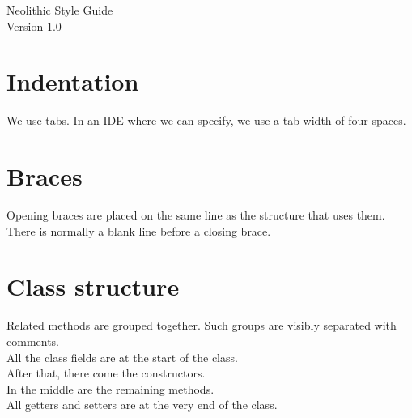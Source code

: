 \documentclass[10pt,a4paper]{report}
\author{Michael Plüss}
\begin{document}
\Huge{Neolithic Style Guide}\\
\normalsize{Version 1.0}\\

\section{Indentation}

We use tabs. In an IDE where we can specify, we use a tab width of four spaces.\\

\section{Braces}

Opening braces are placed on the same line as the structure that uses them.\\
There is normally a blank line before a closing brace.\\

\section{Class structure}

Related methods are grouped together. Such groups are visibly separated with comments.\\
All the class fields are at the start of the class.\\
After that, there come the constructors.\\
In the middle are the remaining methods.\\
All getters and setters are at the very end of the class.\\
\end{document}
